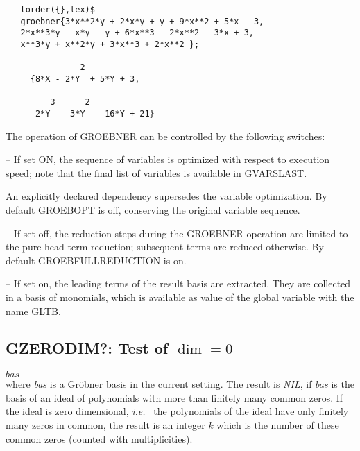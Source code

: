 \example {}
\begin{verbatim}
   torder({},lex)$
   groebner{3*x**2*y + 2*x*y + y + 9*x**2 + 5*x - 3,
   2*x**3*y - x*y - y + 6*x**3 - 2*x**2 - 3*x + 3,
   x**3*y + x**2*y + 3*x**3 + 2*x**2 };

               2
     {8*X - 2*Y  + 5*Y + 3,

         3      2
      2*Y  - 3*Y  - 16*Y + 21}
\end{verbatim}


The operation of GROEBNER can be controlled by the following
switches:
\begin{description}
\item[GROEBOPT] -- If set ON, the sequence of variables is optimized
with respect to execution speed; note that the final list of variables
is available in GVARSLAST.

An explicitly declared dependency supersedes the
variable optimization.
By default GROEBOPT is off, conserving the original variable
sequence.

\item[GROEBFULLREDUCTION] -- If set off, the reduction steps during
the \linebreak[4] GROEBNER operation are limited to the pure head
term reduction; subsequent terms are reduced otherwise.
By default GROEBFULLREDUCTION is on.

\item[GLTBASIS] -- If set on, the leading terms of the result basis are
extracted.  They are collected in a basis of monomials, which is
available as value of the global variable with the name GLTB.

\end{description}

\subsection{GZERODIM?: Test of $\dim = 0$}
\begin{description}
\item[{\it GZERODIM}!?] $bas$ \\
where {\it bas} is a Gr\"obner basis in the current setting.
The result is {\it NIL}, if {\it bas} is the basis of an ideal of
polynomials with more than finitely many common zeros.
If the ideal is zero dimensional, {\em i.e.\ } the polynomials of the
ideal have only finitely many zeros in common, the result is an
integer $k$ which is the number of these common zeros (counted with
multiplicities).
\end{description}

